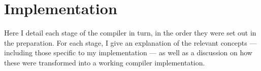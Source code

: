 \chapter{Implementation}
%
%
%


Here I detail each stage of the compiler in turn, in the order they were set out in the preparation. For each stage, I give an explanation of the relevant concepts --- including those specific to my implementation --- as well as a discussion on how these were transformed into a working compiler implementation.

